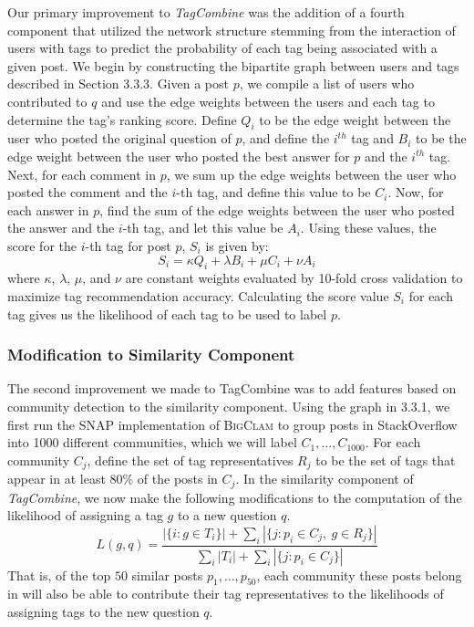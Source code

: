 \documentclass[10pt]{IEEEtran}
\begin{document}
Our primary improvement to \textit{TagCombine} was the addition of a fourth component that utilized the network structure stemming from the interaction of users with tags to predict the probability of each tag being associated with a given post. We begin by constructing the bipartite graph between users and tags described in Section 3.3.3. Given a post $p$, we compile a list of users who contributed to $q$ and use the edge weights between the users and each tag to determine the tag’s ranking score. Define $Q_i$ to be the edge weight between the user who posted the original question of $p$, and define the $i^{th}$ tag and $B_i$ to be the edge weight between the user who posted the best answer for $p$ and the $i^{th}$ tag. Next, for each comment in $p$, we sum up the edge weights between the user who posted the comment and the $i$-th tag, and define this value to be $C_i$. Now, for each answer in $p$, find the sum of the edge weights between the user who posted the answer and the $i$-th tag, and let this value be $A_i$. Using these values, the score for the $i$-th tag for post $p$, $S_i$ is given by:
\[ S_i = \kappa Q_i + \lambda B_i + \mu C_i + \nu A_i \]
where $\kappa$, $\lambda$, $\mu$, and $\nu$ are constant weights evaluated by 10-fold cross validation to maximize tag recommendation accuracy. Calculating the score value $S_i$ for each tag gives us the likelihood of each tag to be used to label $p$.

\subsubsection{Modification to Similarity Component}

The second improvement we made to TagCombine was to add features based on community detection to the similarity component. Using the graph in 3.3.1, we first run the SNAP implementation of \textsc{BigClam} to group posts in StackOverflow into 1000 different communities, which we will label $C_1 , \ldots, C_{1000}$. For each community $C_j$, define the set of tag representatives $R_j$ to be the set of tags that appear in at least $80\%$ of the posts in $C_j$. In the similarity component of \textit{TagCombine}, we now make the following modifications to the computation of the likelihood of assigning a tag $g$ to a new question $q$.
\[ L(g, q) = \frac{ |\{i : g \in T_i \}| + \sum_i |\{j : p_i \in C_j,\ g \in R_j \}| }{\sum_i  |T_i | + \sum_i |\{j : p_i \in C_j\} |} \]
That is, of the top $50$ similar posts $p_1, \ldots, p_{50}$, each community these posts belong in will also be able to contribute their tag representatives to the likelihoods of assigning tags to the new question $q$.
\end{document}
